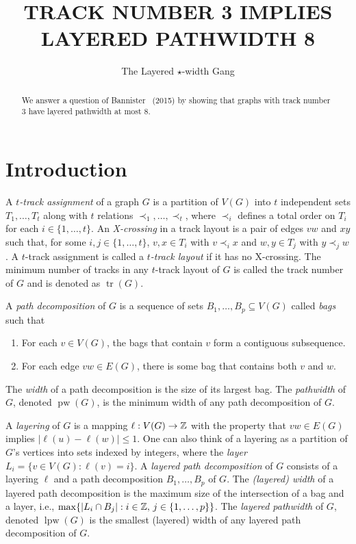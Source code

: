 \documentclass{patmorin}
\title{\MakeUppercase{Track Number 3 Implies Layered Pathwidth 8}}
\author{The Layered $\star$-width Gang}%
\DeclareMathOperator{\tr}{tr}
\DeclareMathOperator{\pw}{pw}
\DeclareMathOperator{\lpw}{lpw}
\begin{document}
\maketitle
%
\begin{abstract}
  We answer a question of Bannister \etal\ (2015) by showing that graphs with
  track number 3 have layered pathwidth at most 8.
\end{abstract}
%
%


\section{Introduction}

A \emph{$t$-track assignment} of a graph $G$ is a partition of $V(G)$
into $t$ independent sets $T_1,\ldots,T_t$ along with $t$ relations
$\prec_1,\ldots,\prec_t$, where $\prec_i$ defines a total order on $T_i$
for each $i\in\{1,\ldots,t\}$. An \emph{X-crossing} in a track layout is a
pair of edges $vw$ and $xy$ such that, for some $i,j\in\{1,\ldots,t\}$,
$v,x\in T_i$ with $v\prec_i x$ and $w,y\in T_j$ with $y\prec_j w$.
A $t$-track assignment is called a \emph{$t$-track layout} if it has no
X-crossing.  The minimum number of tracks in any $t$-track layout of $G$
is called the track number of $G$ and is denoted as $\tr(G)$.

A \emph{path decomposition} of $G$ is a sequence of sets
$B_1,\ldots,B_p\subseteq V(G)$ called \emph{bags} such that
\begin{enumerate}
   \item For each $v\in V(G)$, the bags that contain $v$ form a contiguous subsequence.
   \item For each edge $vw\in E(G)$, there is some bag that contains both $v$ and $w$.
\end{enumerate}
The \emph{width} of a path decomposition is the size of its largest bag.  The \emph{pathwidth} of $G$, denoted $\pw(G)$, is the minimum width of any path decomposition of $G$.

A \emph{layering} of $G$ is a mapping $\ell:V(G)\to\mathbb{Z}$ with the
property that $vw\in E(G)$ implies $|\ell(u)-\ell(w)|\le 1$. One
can also think of a layering as a partition of $G$'s vertices into
sets indexed by integers, where the \emph{layer} $L_i=\{v\in V(G)
: \ell(v)=i\}$.  A \emph{layered path decomposition} of $G$ consists
of a layering $\ell$ and a path decomposition $B_1,\ldots,B_p$ of $G$.
The \emph{(layered) width} of a layered path decomposition is the maximum
size of the intersection of a bag and a layer, i.e., $\max\{|L_i\cap
B_j|:i\in\mathbb{Z},\, j\in\{1,\ldots,p\}\}$.  The \emph{layered pathwidth} of
$G$, denoted $\lpw(G)$ is the smallest (layered) width of any layered
path decomposition of $G$.
\end{document}
